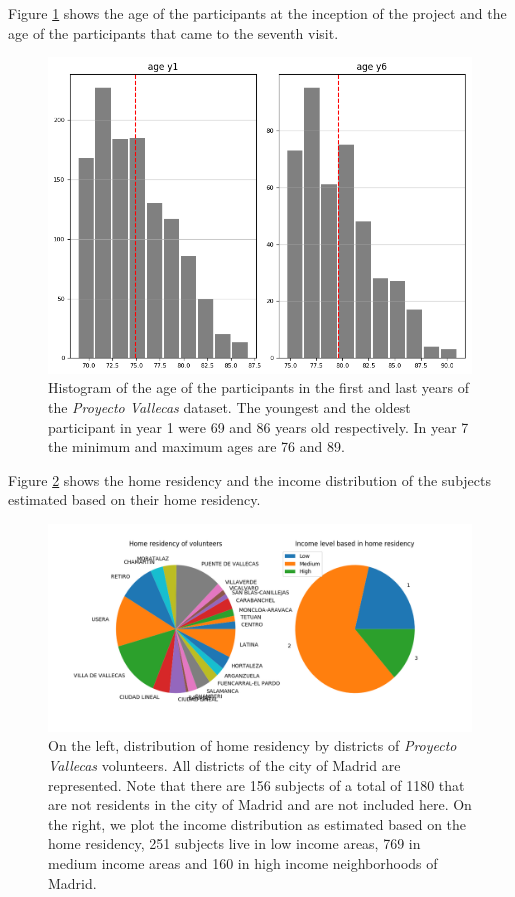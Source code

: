 \documentclass[11pt]{article}
\theoremstyle{definition}
\theoremstyle{remark}
\begin{document}
Figure \ref{fig:ages} shows the age of the participants at the inception of the project and the age of the participants that came to the seventh visit.

\begin{figure}[H]
        \centering
        \includegraphics[keepaspectratio, width=.6\linewidth]{figures/Fig_ages}
        \caption{Histogram of the age of the participants in the first and last years of the \emph{Proyecto Vallecas} dataset. The youngest and the oldest participant in year 1 were 69 and 86 years old respectively. In year 7 the minimum and maximum ages are 76 and 89.} 
        \label{fig:ages}
\end{figure}


Figure \ref{fig:incomeresidency} shows the home residency and the income distribution of the subjects estimated based on their home residency. 

\begin{figure}[H]
        \centering
        \includegraphics[keepaspectratio, width=.8\linewidth]{figures/incomeresidency}
        \caption{On the left, distribution of home residency by districts of \emph{Proyecto Vallecas} volunteers. All districts of the city of Madrid are represented. Note that there are 156 subjects of a total of 1180 that are not residents in the city of Madrid and are not included here. On the right, we plot the income distribution as estimated based on the home residency, 251 subjects live in low income areas, 769 in medium income areas and 160 in high income neighborhoods of Madrid.
        } \label{fig:incomeresidency}
\end{figure}
\end{document}
